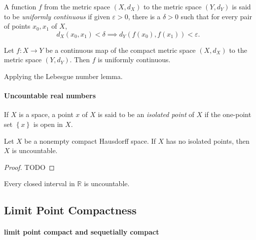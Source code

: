 \begin{definition}
  A function \( f \) from the metric space \( (X, d_X) \) to the metric space \( (Y, d_Y) \) is said to be \emph{uniformly continuous} if given \( \varepsilon > 0 \), there is a \( \delta > 0 \) such that for every pair of points \( x_0, x_1 \) of \( X \),
  \[
    d_X(x_0, x_1) < \delta \implies d_Y(f(x_0), f(x_1)) < \varepsilon.
  \]
\end{definition}

\begin{theorem}
  Let \( f: X \to Y \) be a continuous map of the compact metric space \( (X, d_X) \) to the metric space \( (Y, d_Y) \).
  Then \( f \) is uniformly continuous.
\end{theorem}
\begin{sketchproof}
  Applying the Lebesgue number lemma.
\end{sketchproof}

\paragraph{Uncountable real numbers}

\begin{definition}
  If \( X \) is a space, a point \( x \) of \( X \) is said to be an \emph{isolated point} of \( X \) if the one-point set \( \left\lbrace x \right\rbrace \) is open in \( X \).
\end{definition}

\begin{theorem}
  Let \( X \) be a nonempty compact Hausdorff space.
  If \( X \) has no isolated points, then \( X \) is uncountable.
\end{theorem}
\begin{proof}
  TODO %
\end{proof}

\begin{corollary}
  Every closed interval in \( \mathbb{R} \) is uncountable.
\end{corollary}

\subsection{Limit Point Compactness}

\paragraph{limit point compact and sequetially compact}


